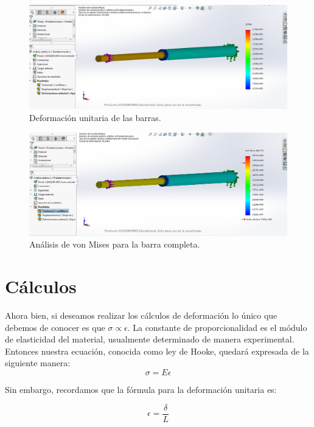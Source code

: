 \documentclass[12pt, letterpaper]{article}
\begin{document}
\begin{figure}[H]
	\centering
	\includegraphics[width=\textwidth]{defu.PNG}
	\caption{Deformación unitaria de las barras.}
\end{figure}

\begin{figure}[H]
	\centering
	\includegraphics[width=\textwidth]{von.PNG}
	\caption{Análisis de von Mises para la barra completa.}
\end{figure}

\section*{Cálculos} 

Ahora bien, si deseamos realizar los cálculos de deformación lo único que debemos de conocer es que $\sigma \propto \epsilon$. La constante de proporcionalidad es el módulo de elasticidad del material, usualmente determinado de manera experimental. Entonces nuestra ecuación, conocida como ley de Hooke, quedará expresada de la siguiente manera:
\begin{equation}
	\sigma = E \epsilon
\end{equation}

Sin embargo, recordamos que la fórmula para la deformación unitaria es:

\begin{equation}
	\epsilon = \frac{\delta}{L}
\end{equation}
\end{document}

